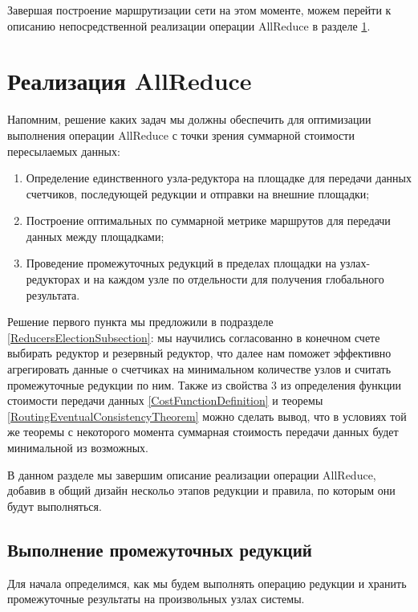 \documentclass{article}
\theoremstyle{plain}
\theoremstyle{plain}
\theoremstyle{plain}
\theoremstyle{plain}
\theoremstyle{definition}
\theoremstyle{remark}
\theoremstyle{plain}
\begin{document}
Завершая построение маршрутизации сети на этом моменте, можем перейти к описанию непосредственной реализации операции AllReduce в разделе \ref{AllReduceSection}.

\section{Реализация AllReduce}
\label{AllReduceSection}

Напомним, решение каких задач мы должны обеспечить для оптимизации выполнения операции AllReduce с точки зрения суммарной стоимости пересылаемых данных:

\begin{enumerate}
    \item Определение единственного узла-редуктора на площадке для передачи данных счетчиков, последующей редукции и отправки на внешние площадки;
    
    \item Построение оптимальных по суммарной метрике маршрутов для передачи данных между площадками;
    
    \item Проведение промежуточных редукций в пределах площадки на узлах-редукторах и на каждом узле по отдельности для получения глобального результата.
\end{enumerate}

Решение первого пункта мы предложили в подразделе \ref{ReducersElectionSubsection}: мы научились согласованно в конечном счете выбирать редуктор и резервный редуктор, что далее нам поможет эффективно агрегировать данные о счетчиках на минимальном количестве узлов и считать промежуточные редукции по ним. Также из свойства 3 из определения функции стоимости передачи данных \ref{CostFunctionDefinition} и теоремы \ref{RoutingEventualConsistencyTheorem} можно сделать вывод, что в условиях той же теоремы с некоторого момента суммарная стоимость передачи данных будет минимальной из возможных.

В данном разделе мы завершим описание реализации операции AllReduce, добавив в общий дизайн нескольо этапов редукции и правила, по которым они будут выполняться.

\subsection{Выполнение промежуточных редукций}
\label{ReductionImplementationSubsection}

Для начала определимся, как мы будем выполнять операцию редукции и хранить промежуточные результаты на произвольных узлах системы.
\end{document}
